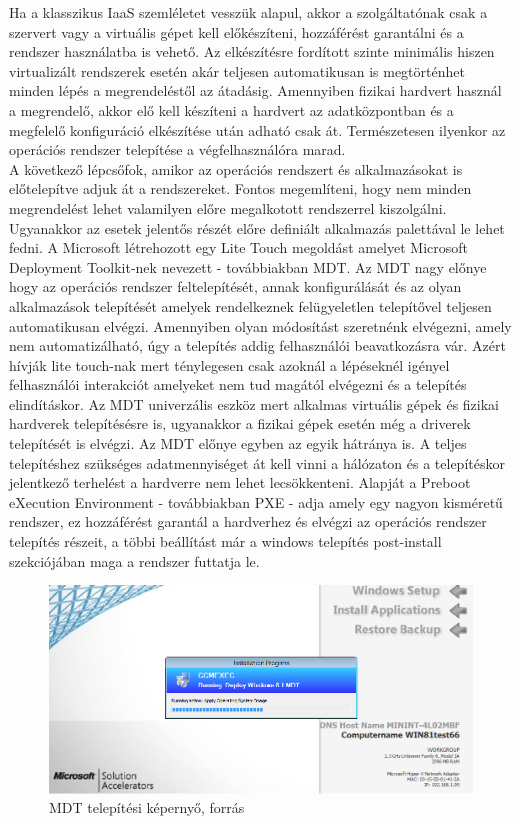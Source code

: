 \documentclass[12pt,oneside,justify,table]{book}
\begin{document}
Ha a klasszikus IaaS szemléletet vesszük alapul, akkor a szolgáltatónak csak a szervert vagy a virtuális gépet kell előkészíteni, hozzáférést garantálni és a rendszer használatba is vehető. Az elkészítésre fordított szinte minimális hiszen virtualizált rendszerek esetén akár teljesen automatikusan is megtörténhet minden lépés a megrendeléstől az átadásig. Amennyiben fizikai hardvert használ a megrendelő, akkor elő kell készíteni a hardvert az adatközpontban és a megfelelő konfiguráció elkészítése után adható csak át. Természetesen ilyenkor az operációs rendszer telepítése a végfelhasználóra marad. \\

A következő lépcsőfok, amikor az operációs rendszert és alkalmazásokat is előtelepítve adjuk át a rendszereket. Fontos megemlíteni, hogy nem minden megrendelést lehet valamilyen előre megalkotott rendszerrel kiszolgálni. Ugyanakkor az esetek jelentős részét előre definiált alkalmazás palettával le lehet fedni. A Microsoft létrehozott egy Lite Touch megoldást amelyet Microsoft Deployment Toolkit-nek nevezett - továbbiakban MDT. Az MDT nagy előnye hogy az operációs rendszer feltelepítését, annak konfigurálását és az olyan alkalmazások telepítését amelyek rendelkeznek felügyeletlen telepítővel teljesen automatikusan elvégzi. Amennyiben olyan módosítást szeretnénk elvégezni, amely nem automatizálható, úgy a telepítés addig felhasználói beavatkozásra vár. Azért hívják lite touch-nak mert ténylegesen csak azoknál a lépéseknél igényel felhasználói interakciót amelyeket nem tud magától elvégezni és a telepítés elindításkor. Az MDT univerzális eszköz mert alkalmas virtuális gépek és fizikai hardverek telepítésésre is, ugyanakkor a fizikai gépek esetén még a driverek telepítését is elvégzi. Az MDT előnye egyben az egyik hátránya is. A teljes telepítéshez szükséges adatmennyiséget át kell vinni a hálózaton és a telepítéskor jelentkező terhelést a hardverre nem lehet lecsökkenteni. Alapját a Preboot eXecution Environment - továbbiakban PXE - adja amely egy nagyon kisméretű rendszer, ez hozzáférést garantál a hardverhez és elvégzi az operációs rendszer telepítés részeit, a többi beállítást már a windows telepítés post-install szekciójában maga a rendszer futtatja le.  \\
\begin{figure}[h]
\centering
\includegraphics[width=1\textwidth]{mdt.png}
\caption{MDT telepítési képernyő, forrás \cite{MDTImage}}
\label{fig:mdt_image}
\end{figure}
\end{document}
